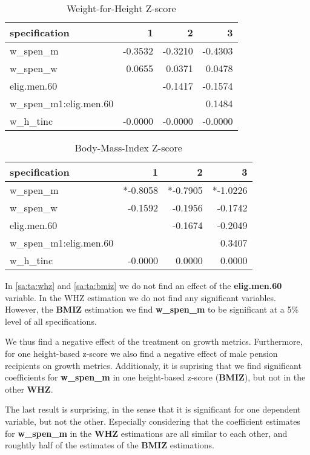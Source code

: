 \begin{refsection}
\begin{table}[!ht]
\centering
\caption{Weight-for-Height Z-score}
\label{sa:ta:whz}
\begin{tabular}{l|rrr}
\hline
specification & 1 & 2 & 3 \\
\hline
w\_spen\_m &  -0.3532 & -0.3210 & -0.4303 \\
w\_spen\_w & 0.0655 & 0.0371 & 0.0478 \\
elig.men.60 & & -0.1417 & -0.1574 \\
w\_spen\_m1:elig.men.60 & & & 0.1484 \\
w\_h\_tinc & -0.0000 & -0.0000 & -0.0000 \\
\end{tabular}
\end{table}

\begin{table}[!ht]
\centering
\caption{Body-Mass-Index Z-score}
\label{sa:ta:bmiz}
\begin{tabular}{l|rrr}
\hline
specification & 1 & 2 & 3 \\
\hline
w\_spen\_m & *-0.8058 & *-0.7905 & *-1.0226 \\
w\_spen\_w & -0.1592 & -0.1956 & -0.1742 \\
elig.men.60 & & -0.1674 & -0.2049 \\
w\_spen\_m1:elig.men.60 & & & 0.3407 \\
w\_h\_tinc & -0.0000 & 0.0000 & 0.0000\\
\end{tabular}
\end{table}


In \autoref{sa:ta:whz} and \autoref{sa:ta:bmiz} we do not find an effect of the \textbf{elig.men.60} variable.
In the WHZ estimation we do not find any significant variables.
However, the \textbf{BMIZ} estimation we find \textbf{w\_spen\_m} to be significant at a 5\% level of all specifications.

We thus find a negative effect of the treatment on growth metrics.
Furthermore, for one height-based z-score we also find a negative effect of male pension recipients on growth metrics.
Additionaly, it is suprising that we find significant coefficients for \textbf{w\_spen\_m} in one height-based z-score (\textbf{BMIZ}), but not in the other \textbf{WHZ}.

The last result is surprising, in the sense that it is significant for one dependent variable, but not the other.
Especially considering that the coefficient estimates for \textbf{w\_spen\_m} in the \textbf{WHZ} estimations are all similar to each other,
and roughtly half of the estimates of the \textbf{BMIZ} estimations.


\end{refsection}
